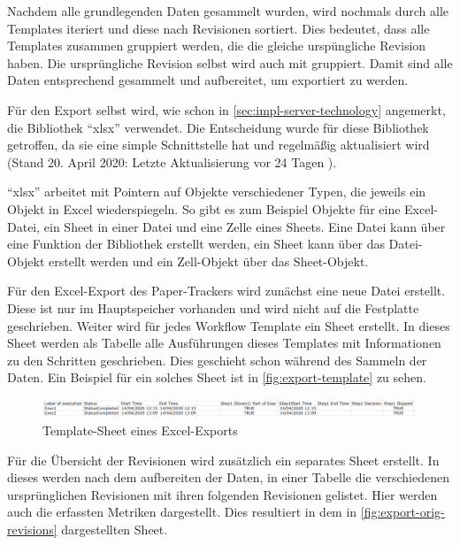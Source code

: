 Nachdem alle grundlegenden Daten gesammelt wurden, wird nochmals durch alle Templates iteriert und diese nach Revisionen sortiert.
Dies bedeutet, dass alle Templates zusammen gruppiert werden, die die gleiche urspüngliche Revision haben.
Die ursprüngliche Revision selbst wird auch mit gruppiert.
Damit sind alle Daten entsprechend gesammelt und aufbereitet, um exportiert zu werden.

Für den Export selbst wird, wie schon in \autoref{sec:impl-server-technology} angemerkt, die Bibliothek \enquote{xlsx} verwendet.
Die Entscheidung wurde für diese Bibliothek getroffen, da sie eine simple Schnittstelle hat und regelmäßig aktualisiert wird
(Stand 20. April 2020: Letzte Aktualisierung vor 24 Tagen \cite{tealeg2020}).

\enquote{xlsx} arbeitet mit Pointern auf Objekte verschiedener Typen, die jeweils ein Objekt in Excel wiederspiegeln.
So gibt es zum Beispiel Objekte für eine Excel-Datei, ein Sheet in einer Datei und eine Zelle eines Sheets.
Eine Datei kann über eine Funktion der Bibliothek erstellt werden, ein Sheet kann über das Datei-Objekt erstellt werden
und ein Zell-Objekt über das Sheet-Objekt.

Für den Excel-Export des Paper-Trackers wird zunächst eine neue Datei erstellt.
Diese ist nur im Hauptspeicher vorhanden und wird nicht auf die Festplatte geschrieben.
Weiter wird für jedes Workflow Template ein Sheet erstellt.
In dieses Sheet werden als Tabelle alle Ausführungen dieses Templates mit Informationen zu den Schritten geschrieben.
Dies geschieht schon während des Sammeln der Daten.
Ein Beispiel für ein solches Sheet ist in \autoref{fig:export-template} zu sehen.

\begin{figure}[htbp]
	\includegraphics[width=\textwidth]{images/export_template.png}
	\centering
	\caption{Template-Sheet eines Excel-Exports}
	\label{fig:export-template}
\end{figure}

Für die Übersicht der Revisionen wird zusätzlich ein separates Sheet erstellt.
In dieses werden nach dem aufbereiten der Daten, in einer Tabelle die verschiedenen ursprünglichen Revisionen
mit ihren folgenden Revisionen gelistet.
Hier werden auch die erfassten Metriken dargestellt.
Dies resultiert in dem in \autoref{fig:export-orig-revisions} dargestellten Sheet.

